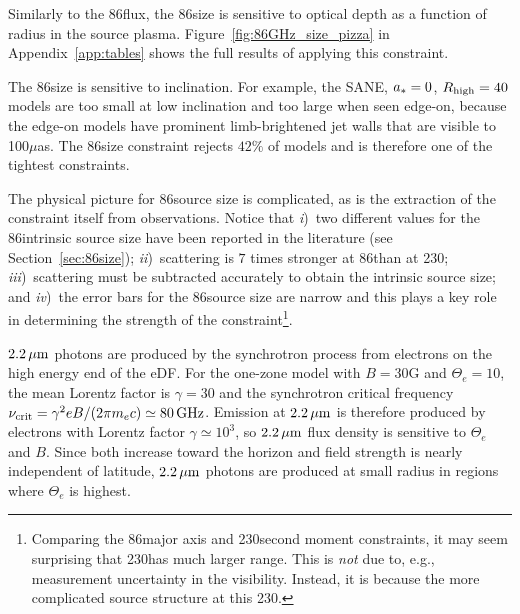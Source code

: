 
Similarly to the 86\GHz flux, the 86\GHz size is sensitive to optical depth as a function of radius in the source plasma.
Figure~\ref{fig:86GHz_size_pizza} in Appendix~\ref{app:tables} shows the full results of applying this constraint.

The 86\GHz size is sensitive to inclination.
For example, the SANE, $a_* = 0$, $R_\mathrm{high} = 40$ models are too small at low inclination and too large when seen edge-on, because the edge-on models have prominent limb-brightened jet walls that are visible to 100$\mu$as.
The 86\GHz size constraint rejects $42\%$ of models and is therefore one of the tightest constraints.

The physical picture for 86\GHz source size is complicated, as is the extraction of the constraint itself from observations.
Notice that
\emph{i})~two different values for the 86\GHz intrinsic source size have been reported in the literature (see Section~\ref{sec:86size});
\emph{ii})~scattering is $7$ times stronger at 86\GHz than at 230\GHz;
\emph{iii})~scattering must be subtracted accurately to obtain the intrinsic source size; and
\emph{iv})~the error bars for the 86\GHz source size are narrow and this plays a key role in determining the strength of the constraint\footnote{Comparing the 86\GHz major axis and 230\GHz second moment constraints, it may seem surprising that 230\GHz has much larger range.
This is \emph{not} due to, e.g., measurement uncertainty in the visibility.
Instead, it is because the more complicated source structure at this 230\GHz.}.


$2.2\,\mu\mathrm{m}$ photons are produced by the synchrotron process from electrons on the high energy end of the eDF.
For the one-zone model with $B = 30$G and $\Theta_e = 10$, the mean Lorentz factor is $\gamma = 30$ and the synchrotron critical frequency $\nu_\mathrm{crit} = \gamma^2 e B/(2 \pi m_e c) \simeq 80\,\mathrm{GHz}$.
Emission at $2.2\,\mu\mathrm{m}$ is therefore produced by electrons with Lorentz factor $\gamma \simeq 10^3$, so $2.2\,\mu\mathrm{m}$ flux density is sensitive to $\Theta_e$ and $B$.
Since both increase toward the horizon and field strength is nearly independent of latitude, $2.2\,\mu\mathrm{m}$ photons are produced at small radius in regions where $\Theta_e$ is highest.

